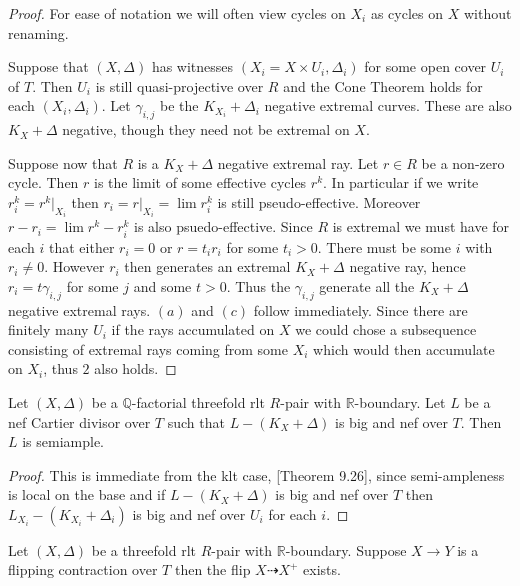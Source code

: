 \documentclass[a4paper,12pt]{amsart}
\begin{document}
	
	\begin{proof}
		
		For ease of notation we will often view cycles on $X_{i}$ as cycles on $X$ without renaming.
		
		Suppose that $(X,\Delta)$ has witnesses $(X_{i}=X \times U_{i}, \Delta_{i})$ for some open cover $U_{i}$ of $T$. Then $U_{i}$ is still quasi-projective over $R$ and the Cone Theorem holds for each $(X_{i},\Delta_{i})$. Let $\gamma_{i,j}$ be the $K_{X_{i}}+\Delta_{i}$ negative extremal curves. These are also $K_{X}+\Delta$ negative, though they need not be extremal on $X$.
		
		Suppose now that $R$ is a $K_{X}+\Delta$ negative extremal ray. Let $r\in R$ be a non-zero cycle. Then $r$ is the limit of some effective cycles $r^{k}$. In particular if we write $r^{k}_{i}=r^{k}|_{X_{i}}$ then $r_{i}=r|_{X_{i}}=\lim r^{k}_{i}$ is still pseudo-effective. Moreover $r-r_{i}=\lim r^{k}-r^{k}_{i}$ is also psuedo-effective. Since $R$ is extremal we must have for each $i$ that either $r_{i}=0$ or $r=t_{i}r_{i}$ for some $t_{i} > 0$. There must be some $i$ with $r_{i} \neq 0$. However $r_{i}$ then generates an extremal $K_{X}+\Delta$ negative ray, hence $r_{i}=t\gamma_{i,j}$ for some $j$ and some $t>0$. Thus the $\gamma_{i,j}$ generate all the $K_{X}+\Delta$ negative extremal rays. $(a)$ and $(c)$ follow immediately. Since there are finitely many $U_{i}$ if the rays accumulated on $X$ we could chose a subsequence consisting of extremal rays coming from some $X_{i}$ which would then accumulate on $X_{i}$, thus $2$ also holds.
	\end{proof}

	\begin{theorem}
		Let $(X,\Delta)$ be a $\mathbb{Q}$-factorial threefold rlt $R$-pair with $\mathbb{R}$-boundary. Let $L$ be a nef Cartier divisor over $T$ such that $L-(K_{X}+\Delta)$ is big and nef over $T$. Then $L$ is semiample.
	\end{theorem}
	
	\begin{proof}
		This is immediate from the klt case, \cite{bhatt2020globally+}[Theorem 9.26], since semi-ampleness is local on the base and if $L-(K_{X}+\Delta)$ is big and nef over $T$ then $L_{X_{i}}-(K_{X_{i}}+\Delta_{i})$ is big and nef over $U_{i}$ for each $i$.
	\end{proof}

	\begin{theorem}
	Let $(X,\Delta)$ be a threefold rlt $R$-pair with $\mathbb{R}$-boundary. Suppose $X \to Y$ is a flipping contraction over $T$ then the flip $X \dashrightarrow X^{+}$ exists. 
	\end{theorem}
\end{document}
